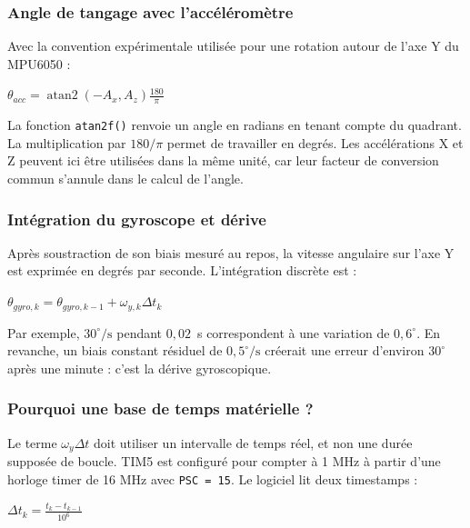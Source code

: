 \documentclass[11pt,a4paper]{article}
\begin{document}
	\subsubsection*{Angle de tangage avec l'accéléromètre}
	
	Avec la convention expérimentale utilisée pour une rotation autour de l'axe Y du MPU6050 :
	
	\begin{center}
		\(\displaystyle \theta_{acc}=\operatorname{atan2}(-A_x,A_z)\frac{180}{\pi}\)
	\end{center}
	
	La fonction \texttt{atan2f()} renvoie un angle en radians en tenant compte du quadrant. La multiplication par \(180/\pi\) permet de travailler en degrés. Les accélérations X et Z peuvent ici être utilisées dans la même unité, car leur facteur de conversion commun s'annule dans le calcul de l'angle.
	
	\subsubsection*{Intégration du gyroscope et dérive}
	
	Après soustraction de son biais mesuré au repos, la vitesse angulaire sur l'axe Y est exprimée en degrés par seconde. L'intégration discrète est :
	
	\begin{center}
		\(\displaystyle \theta_{gyro,k}=\theta_{gyro,k-1}+\omega_{y,k}\Delta t_k\)
	\end{center}
	
	Par exemple, \(30^\circ/\mathrm{s}\) pendant \(0{,}02\)~s correspondent à une variation de \(0{,}6^\circ\). En revanche, un biais constant résiduel de \(0{,}5^\circ/\mathrm{s}\) créerait une erreur d'environ \(30^\circ\) après une minute : c'est la dérive gyroscopique.
	
	\subsubsection*{Pourquoi une base de temps matérielle ?}
	
	Le terme \(\omega_y\Delta t\) doit utiliser un intervalle de temps réel, et non une durée supposée de boucle. TIM5 est configuré pour compter à 1 MHz à partir d'une horloge timer de 16 MHz avec \texttt{PSC = 15}. Le logiciel lit deux timestamps :
	
	\begin{center}
		\(\displaystyle \Delta t_k = \frac{t_k-t_{k-1}}{10^6}\)
	\end{center}
	
\end{document}
